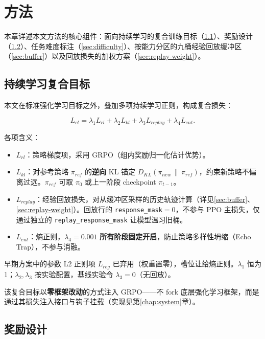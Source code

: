\chapter{方法}
\label{chap:method}

本章详述本文方法的核心组件：面向持续学习的复合训练目标（\ref{sec:cl-loss}）、奖励设计（\ref{sec:reward}）、任务难度标注（\ref{sec:difficulty}）、按能力分区的九桶经验回放缓冲区（\ref{sec:buffer}）以及回放损失的加权方案（\ref{sec:replay-weight}）。

\section{持续学习复合目标}
\label{sec:cl-loss}

本文在标准强化学习目标之外，叠加多项持续学习正则，构成复合损失：

\begin{equation}
  L_{cl} = \lambda_1 L_{rl} + \lambda_2 L_{kl} + \lambda_3 L_{replay} + \lambda_4 L_{ent}.
  \label{eq:cl-loss}
\end{equation}

各项含义：

\begin{itemize}
  \item $L_{rl}$：策略梯度项，采用 GRPO（组内奖励归一化估计优势）。
  \item $L_{kl}$：对参考策略 $\pi_{ref}$ 的\textbf{逆向} KL 锚定 $D_{KL}(\pi_{new}\,\|\,\pi_{ref})$，约束新策略不偏离过远。$\pi_{ref}$ 可取 $\pi_0$ 或上一阶段 checkpoint $\pi_{t-1}$。
  \item $L_{replay}$：经验回放损失，对从缓冲区采样的历史轨迹计算（详见\ref{sec:buffer}、\ref{sec:replay-weight}）。回放行的 \texttt{response\_mask}$=0$，不参与 PPO 主损失，仅通过独立的 \texttt{replay\_response\_mask} 让模型温习旧桶。
  \item $L_{ent}$：熵正则，$\lambda_4=0.001$ \textbf{所有阶段固定开启}，防止策略多样性坍缩（Echo Trap），不参与消融。
\end{itemize}

早期方案中的参数 L2 正则项 $L_{reg}$ 已弃用（权重置零），槽位让给熵正则。$\lambda_1$ 恒为 1；$\lambda_2,\lambda_3$ 按实验配置，基线实验令 $\lambda_3=0$（无回放）。

该复合目标以\textbf{零框架改动}的方式注入 GRPO——不 fork 底层强化学习框架，而是通过其损失注入接口与钩子挂载（实现见第\ref{chap:system}章）。

\section{奖励设计}
\label{sec:reward}

